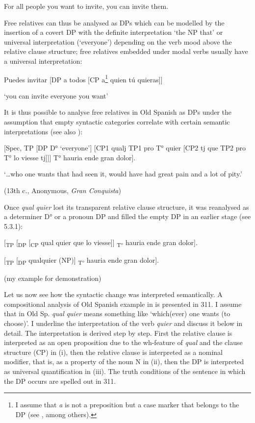 {For all people you want to invite, you can invite them.}

Free relatives can thus be analysed as DPs which can be modelled by the insertion of a covert DP with the definite interpretation ‘the NP that’ or universal interpretation (‘everyone’) depending on the verb mood above the relative clause structure; free relatives embedded under modal verbs usually have a universal interpretation:

{  Puedes invitar [DP a todos [CP a}\footnote{{I assume that} {\textit{a}} {is not a preposition but a case marker that belongs to the DP (see \citealt{Lopez2000}, among others).}}{ quien tú quieras]]}

{  ‘you can invite everyone you want’}

It is thus possible to analyse free relatives in Old Spanish as DPs under the assumption that empty syntactic categories correlate with certain semantic interpretations (see also \citealt{Rivero1988}):

{  [Spec, TP [DP D° ‘everyone’] [CP1 qualj TP1 pro T° quier [CP2 tj que TP2 pro T° lo viesse tj]]] T° hauria ende gran dolor].}

  ‘…who one wants that had seen it, would have had great pain and a lot of pity.’

{  (13th c.,}{ }{Anonymous,} {\textit{Gran Conquista}}{)}

Once \textit{qual quier} lost its transparent relative clause structure, it was reanalysed as a determiner D° or a pronoun DP and filled the empty DP in an earlier stage (see 5.3.1):

  [\textsubscript{TP} [\textsubscript{DP} [\textsubscript{CP} qual quier que lo viesse]] \textsubscript{T°} hauria ende gran dolor]. 

  [\textsubscript{TP} [\textsubscript{DP} qualquier (NP)] \textsubscript{T°} hauria ende gran dolor]. 

{  (my example for demonstration)}

Let us now see how the syntactic change was interpreted semantically. A compositional analysis of Old Spanish example in  is presented in 311. I assume that in Old Sp. \textit{qual} \textit{quier} means something like ‘which(ever) one wants (to choose)’. I underline the interpretation of the verb \textit{quier} and discuss it below in detail. The interpretation is derived step by step. First the relative clause is interpreted as an open proposition due to the wh-feature of \textit{qual} and the clause structure (CP) in (i), then the relative clause is interpreted as a nominal modifier, that is, as a property of the noun N in (ii), then the DP is interpreted as universal quantification in (iii). The truth conditions of the sentence in which the DP occurs are spelled out in 311.

